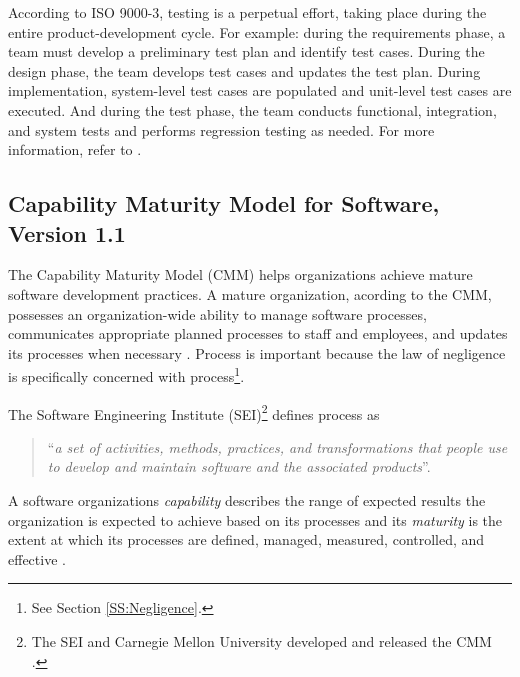 According to ISO 9000-3, testing is a perpetual effort, taking place during the
entire product-development cycle. For example: during the requirements phase, a
team must develop a preliminary test plan and identify test cases. During the
design phase, the team develops test cases and updates the test plan. During
implementation, system-level test cases are populated and unit-level test cases
are executed. And during the test phase, the team conducts functional,
integration, and system tests and performs regression testing as needed. For
more information, refer to \cite{Kehoe96}.

\subsection{Capability Maturity Model for Software, Version 1.1}
The Capability Maturity Model (CMM) helps organizations achieve mature software
development practices. A mature organization, acording to the CMM, possesses an
organization-wide ability to manage software processes, communicates appropriate
planned processes to staff and employees, and updates its processes when
necessary \cite{CMM11}. Process is important because the law of negligence is
specifically concerned with process\footnote{See Section \ref{SS:Negligence}.}.

The Software Engineering Institute (SEI)\footnote{The SEI and Carnegie Mellon
University developed and released the CMM \cite{CMM11}.} defines process as
\begin{quote}
``\textit{a set of activities, methods, practices, and transformations that 
people use to develop and maintain software and the associated 
products}''\cite{CMM11}.
\end{quote}
A software organizations \textit{capability} describes the range of expected
results the organization is expected to achieve based on its processes and its
\textit{maturity} is the extent at which its processes are defined, managed,
measured, controlled, and effective \cite{CMM11}.

